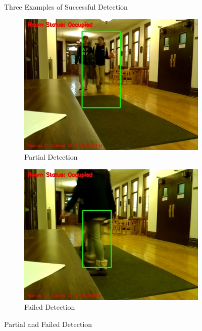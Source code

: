 \begin{figure}[h]
\endminipage
\caption{Three Examples of Successful Detection}
\end{figure}


\begin{figure}[h]
        \centering
        \begin{subfigure}[b]{0.45\textwidth}
                \centering
                \includegraphics[width=\textwidth]{images/body4.jpg}
                \caption{Partial Detection}
                \label{fig:sensor3}
        \end{subfigure}%
        \hfill %
        \begin{subfigure}[b]{0.45\textwidth}
                \centering
                \includegraphics[width=\textwidth]{images/body5.jpg}
                \caption{Failed Detection}
                \label{fig:tiger}
        \end{subfigure}
        \caption{Partial and Failed Detection}
\end{figure}

\pagebreak